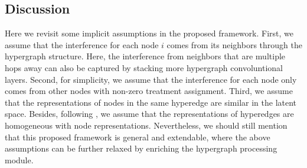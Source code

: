 \subsection{Discussion} 
Here we revisit some implicit assumptions in the proposed framework. 
First, we assume that the interference for each node $i$ comes from its neighbors through the hypergraph structure. Here, the interference from neighbors that are multiple hops away can also be captured by stacking more hypergraph convoluntional layers.  
Second, for simplicity, we assume that the interference for each node only comes from other nodes with non-zero treatment assignment. 
Third, we assume that the representations of nodes in the same hyperedge are similar in the latent space. Besides, following \cite{bai2021hypergraph}, we assume that the representations of hyperedges are homogeneous with node representations. Nevertheless, we should still mention that this proposed framework is general and extendable, where the above assumptions can be further relaxed by enriching the hypergraph processing module.
